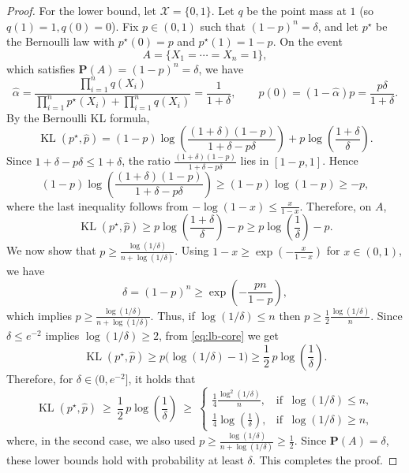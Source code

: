 \documentclass[11pt]{article}
\renewcommand{\P}{\mathbf P}
\renewcommand{\le}{\leqslant}
\renewcommand{\ge}{\geqslant}
\newcommand{\X}{\mathcal{X}}
\newcommand{\kl}{\operatorname{KL}}
\theoremstyle{definition}
\theoremstyle{remark}
\begin{document}
\begin{proof}
For the lower bound, let $\X=\{0,1\}$. Let $q$ be the point mass at $1$ (so $q(1)=1,q(0)=0$). Fix $p\in(0,1)$ such that $(1-p)^n=\delta$, and let $p^\star$ be the Bernoulli law with $p^\star(0)=p$ and $p^\star(1)=1-p$. On the event
\[
A=\{X_1=\cdots=X_n=1\},
\]
which satisfies $\P(A)=(1-p)^n=\delta$, we have
\[
\widehat\alpha=\frac{\prod_{i=1}^n q(X_i)}{\prod_{i=1}^n p^\star(X_i)+\prod_{i=1}^n q(X_i)}=\frac{1}{1+\delta},
\qquad
\widehat p(0)=(1-\widehat\alpha)p=\frac{p\delta}{1+\delta}.
\]
By the Bernoulli KL formula,
\[
\kl(p^\star,\widehat p)
=(1-p)\log\left(\frac{(1+\delta)(1-p)}{1+\delta-p\delta}\right)
+p\log\left(\frac{1+\delta}{\delta}\right).
\]
Since $1+\delta-p\delta\le 1+\delta$, the ratio $\frac{(1+\delta)(1-p)}{1+\delta-p\delta}$ lies in $[1-p,1]$. Hence
\[
(1-p)\log\left(\frac{(1+\delta)(1-p)}{1+\delta-p\delta}\right)\ge (1-p)\log(1-p)\ge -p,
\]
where the last inequality follows from $-\log(1-x)\le \frac{x}{1-x}$. Therefore, on $A$,
\begin{equation}
\label{eq:lb-core}
\kl(p^\star,\widehat p)\ge p\log\left(\frac{1+\delta}{\delta}\right)-p \ge p\log\left(\frac{1}{\delta}\right)-p.
\end{equation}
We now show that $p\ge \frac{\log(1/\delta)}{n+\log(1/\delta)}$.
Using $1-x\ge \exp\left(-\frac{x}{1-x}\right)$ for $x\in(0,1)$, we have
\[
\delta=(1-p)^n\ge \exp\left(-\frac{pn}{1-p}\right),
\]
which implies $p\ge \frac{\log(1/\delta)}{n+\log(1/\delta)}$.
Thus, if $\log(1/\delta)\le n$ then $p\ge \frac{1}{2}\frac{\log(1/\delta)}{n}$.
Since $\delta\le e^{-2}$ implies $\log(1/\delta)\ge 2$, from \eqref{eq:lb-core} we get
\[
\kl(p^\star,\widehat p)\ge p\bigl(\log(1/\delta)-1\bigr)\ge \frac{1}{2}\,p\log\left(\frac{1}{\delta}\right).
\]
Therefore, for $\delta\in(0,e^{-2}]$, it holds that
\[
\kl(p^\star,\widehat p)\ \ge\ \frac{1}{2}\,p\log\left(\frac{1}{\delta}\right)
\ \ge\ \begin{cases}
\displaystyle \frac{1}{4}\frac{\log^2(1/\delta)}{n}, & \text{if }\ \log(1/\delta)\le n,\\[1.2ex]
\displaystyle \frac{1}{4}\log\left(\frac{1}{\delta}\right), & \text{if }\ \log(1/\delta)\ge n,
\end{cases}
\]
where, in the second case, we also used $p\ge \frac{\log(1/\delta)}{n+\log(1/\delta)}\ge \frac{1}{2}$. Since $\P(A)=\delta$, these lower bounds hold with probability at least $\delta$. This completes the proof.
\end{proof}
\end{document}
